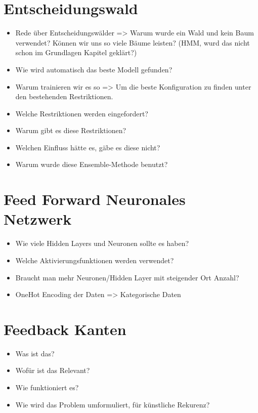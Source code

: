 \section{Entscheidungswald}
\begin{itemize}
    \item Rede über Entscheidungswälder => Warum wurde ein Wald und kein Baum verwendet? Können wir uns so viele Bäume leisten? (HMM, wurd das nicht schon im Grundlagen Kapitel geklärt?)
    \item Wie wird automatisch das beste Modell gefunden?
    \item Warum trainieren wir es so => Um die beste Konfiguration zu finden unter den bestehenden Restriktionen.
    \item Welche Restriktionen werden eingefordert?
    \item Warum gibt es diese Restriktionen?
    \item Welchen Einfluss hätte es, gäbe es diese nicht?
    \item Warum wurde diese Ensemble-Methode benutzt?
\end{itemize}

\section{Feed Forward Neuronales Netzwerk}
\begin{itemize}
    \item Wie viele Hidden Layers und Neuronen sollte es haben?
    \item Welche Aktivierungsfunktionen werden verwendet?
    \item Braucht man mehr Neuronen/Hidden Layer mit steigender Ort Anzahl?
    \item OneHot Encoding der Daten => Kategorische Daten
\end{itemize}

\section{Feedback Kanten}
\begin{itemize}
    \item Was ist das?
    \item Wofür ist das Relevant?
    \item Wie funktioniert es?
    \item Wie wird das Problem umformuliert, für künstliche Rekurenz?
\end{itemize}

